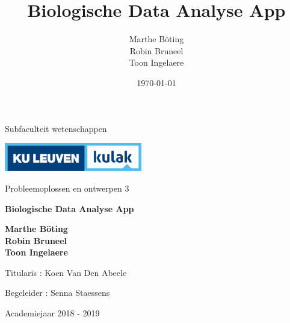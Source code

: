 \documentclass{article}
\title{Biologische Data Analyse App}
\author{Marthe B\"{o}ting\\
	Robin Bruneel\\
	Toon Ingelaere}
\date{\today}
\begin{document}
\pagestyle{empty}

\begin{center}
	{{\Large Subfaculteit wetenschappen}
	
	\vspace{1cm}
	
	\includegraphics[width=6cm]{2013-kulak-cmyk-highres.jpg}
	
	\vspace{1cm}
	
	\Large Probleemoplossen en ontwerpen 3}
	
	\vspace{2cm}

	{\Huge \textbf{Biologische Data Analyse App}}
	
	\vspace{1cm}
	
	{\Large \textbf{}}
	
	\vspace{1cm}
	
	{\Large \textbf{Marthe B\"{o}ting}}\\
	{\Large \textbf{Robin Bruneel}}\\
	{\Large \textbf{Toon Ingelaere}}\\

\end{center}

\vspace{2cm}
{\Large Titularis : Koen Van Den Abeele}
\vspace{1cm}

{\Large Begeleider : Senna Staessens}


\vspace{1cm}

\begin{center}
	{\Large Academiejaar 2018 - 2019}
\end{center}
\end{document}
